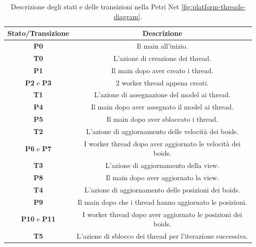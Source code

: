 \documentclass[11pt,notitlepage]{article}
\begin{document}
\begin{table}[H]
    \centering
    \begin{tabular}{|c|l|}
        \hline
        \textbf{Stato/Transizione} & \multicolumn{1}{c|}{\textbf{Descrizione}} \\
        \hline
        \rule{0pt}{2.5ex} \textbf{P0} & \multicolumn{1}{c|}{Il main all'inizio.} \\[0.5ex]
        \hline
        \rule{0pt}{2.5ex} \textbf{T0} & \multicolumn{1}{c|}{L'azione di creazione dei thread.} \\[0.5ex]
        \hline
        \rule{0pt}{2.5ex} \textbf{P1} & \multicolumn{1}{c|}{Il main dopo aver creato i thread.} \\[0.5ex]
        \hline
        \rule{0pt}{2.5ex} \textbf{P2} e \textbf{P3} & \multicolumn{1}{c|}{2 worker thread appena creati.} \\[0.5ex]
        \hline
        \rule{0pt}{2.5ex} \textbf{T1} & \multicolumn{1}{c|}{L'azione di assegnazione del model ai thread.} \\[0.5ex]
        \hline
        \rule{0pt}{2.5ex} \textbf{P4} & \multicolumn{1}{c|}{Il main dopo aver assegnato il model ai thread.} \\[0.5ex]
        \hline
        \rule{0pt}{2.5ex} \textbf{P5} & \multicolumn{1}{c|}{Il main dopo aver sbloccato i thread.} \\[0.5ex]
        \hline
        \rule{0pt}{2.5ex} \textbf{T2} & \multicolumn{1}{c|}{L'azione di aggiornamento delle velocità dei boids.} \\[0.5ex]
        \hline
        \rule{0pt}{2.5ex} \textbf{P6} e \textbf{P7} & \multicolumn{1}{c|}{I worker thread dopo aver aggiornato le velocità dei boids.} \\[0.5ex]
        \hline
        \rule{0pt}{2.5ex} \textbf{T3} & \multicolumn{1}{c|}{L'azione di aggiornamento della view.} \\[0.5ex]
        \hline
        \rule{0pt}{2.5ex} \textbf{P8} & \multicolumn{1}{c|}{Il main dopo aver aggiornato la view.} \\[0.5ex]
        \hline
        \rule{0pt}{2.5ex} \textbf{T4} & \multicolumn{1}{c|}{L'azione di aggiornamento delle posizioni dei boids.} \\[0.5ex]
        \hline
        \rule{0pt}{2.5ex} \textbf{P9} & \multicolumn{1}{c|}{Il main dopo che i thread hanno aggiornato le posizioni.} \\[0.5ex]
        \hline
        \rule{0pt}{2.5ex} \textbf{P10} e \textbf{P11} & \multicolumn{1}{c|}{I worker thread dopo aver aggiornato le posizioni dei boids.} \\[0.5ex]
        \hline
        \rule{0pt}{2.5ex} \textbf{T5} & \multicolumn{1}{c|}{L'azione di sblocco dei thread per l'iterazione successiva.} \\[0.5ex]
        \hline
    \end{tabular}
    \caption{Descrizione degli stati e delle transizioni nella Petri Net \ref{fig:platform-threads-diagram}.}
    \label{tab:petri-net-description}
\end{table}
\end{document}
